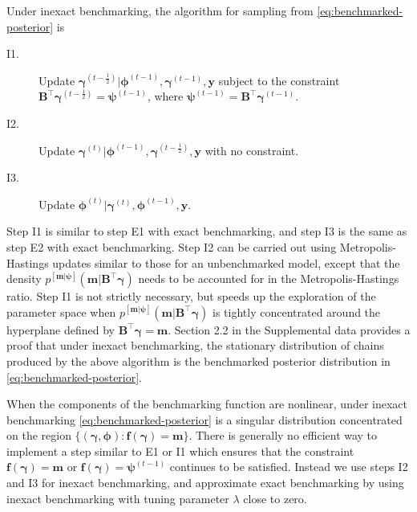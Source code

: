 \documentclass[12pt]{article}
\begin{document}
Under inexact benchmarking, the algorithm for sampling from \eqref{eq:benchmarked-posterior} is
\begin{description}
  \item[I1.] Update $\bm{\gamma}^{(t-\frac{1}{2})} | \bm{\phi}^{(t-1)}, \bm{\gamma}^{(t-1)}, \bm{y}$ subject to the constraint $\bm{B}^{\top} \bm{\gamma}^{(t-\frac{1}{2})} =\bm{\psi}^{(t-1)}$, where $\bm{\psi}^{(t-1)}=\bm{B}^{\top}\bm{\gamma}^{(t-1)}$.
  \item[I2.] Update $\bm{\gamma}^{(t)} | \bm{\phi}^{(t-1)}, \bm{\gamma}^{(t-\frac{1}{2})}, \bm{y}$ with no constraint.
  \item[I3.] Update $\bm{\phi}^{(t)} | \bm{\gamma}^{(t)}, \bm{\phi}^{(t-1)}, \bm{y}$.
\end{description}
Step I1 is similar to step E1 with exact benchmarking, and step I3 is the same as step E2 with exact benchmarking.  Step I2 can be carried out using Metropolis-Hastings updates similar to those for an unbenchmarked model, except that the density $p^{[\bm{m}|\bm{\psi}]}(\bm{m}|\bm{B}^{\top} \bm{\gamma})$ needs to be accounted for in the Metropolis-Hastings ratio.  Step I1 is not strictly necessary, but speeds up the exploration of the parameter space when $p^{[\bm{m}|\bm{\psi}]}(\bm{m}|\bm{B}^{\top} \bm{\gamma})$ is tightly concentrated around the hyperplane defined by $\bm{B}^{\top} \bm{\gamma} = \bm{m}$. Section 2.2 in the Supplemental data provides a proof that under inexact benchmarking, the stationary distribution of chains produced by the above algorithm is the benchmarked posterior distribution in \eqref{eq:benchmarked-posterior}.

When the components of the benchmarking function are nonlinear, under inexact benchmarking \eqref{eq:benchmarked-posterior} is a singular distribution concentrated on the region $\{(\bm{\gamma},\bm{\phi}): \bm{f}(\bm{\gamma})=\bm{m}\}$.  There is generally no efficient way to implement a step similar to E1 or I1 which ensures that the constraint $\bm{f}(\bm{\gamma})=\bm{m}$ or $\bm{f}(\bm{\gamma})=\bm{\psi}^{(t-1)}$ continues to be satisfied.  Instead we use steps I2 and I3 for inexact benchmarking, and approximate exact benchmarking by using inexact benchmarking with tuning parameter $\lambda$ close to zero.
\end{document}
